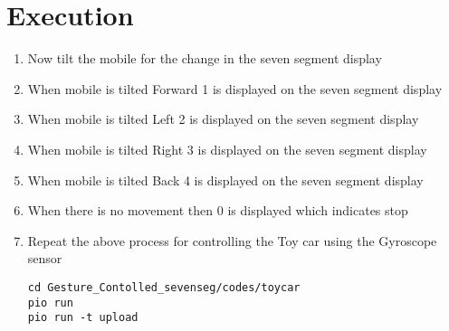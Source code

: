 \section{Execution}
\begin{enumerate}
    \item Now tilt the mobile for the change in the seven segment display
    \item When mobile is tilted Forward 1 is displayed on the seven segment display
    \item When mobile is tilted Left 2 is displayed on the seven segment display
    \item When mobile is tilted Right 3 is displayed on the seven segment display
    \item When mobile is tilted Back 4 is displayed on the seven segment display
    \item When there is no movement then 0 is displayed which indicates stop
    \item Repeat the above process for controlling the Toy car using the Gyroscope sensor
\begin{lstlisting}
cd Gesture_Contolled_sevenseg/codes/toycar
pio run
pio run -t upload
\end{lstlisting}
\end{enumerate}
